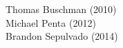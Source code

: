     \begin{multicols}{2}
    \noindent
    Thomas Buschman (2010) \\
    Michael Penta (2012)  \\ 	
    Brandon Sepulvado (2014)
\end{multicols}